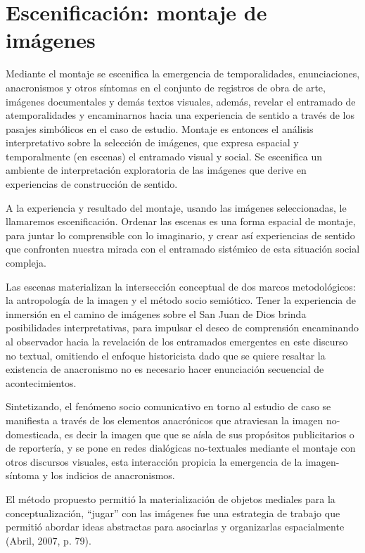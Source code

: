 \section{Escenificación: montaje de imágenes}

Mediante el montaje se escenifica la emergencia de temporalidades, enunciaciones, anacronismos y otros síntomas en el conjunto de registros de obra de arte, imágenes documentales y demás textos visuales, además, revelar el entramado de atemporalidades y encaminarnos hacia una experiencia de sentido a través de los pasajes simbólicos en el caso de estudio. Montaje es entonces el análisis interpretativo sobre la selección de imágenes, que expresa espacial y temporalmente (en escenas) el entramado visual y social. Se escenifica un ambiente de interpretación exploratoria de las imágenes que derive en experiencias de construcción de sentido.

A la experiencia y resultado del montaje, usando las imágenes seleccionadas, le llamaremos escenificación. Ordenar las escenas es una forma espacial de montaje, para juntar lo comprensible con lo imaginario, y crear así experiencias de sentido que confronten nuestra mirada con el entramado sistémico de esta situación social compleja.

Las escenas materializan la intersección conceptual de dos marcos metodológicos: la antropología de la imagen y el método socio semiótico. Tener la experiencia de inmersión en el camino de imágenes sobre el San Juan de Dios brinda posibilidades interpretativas, para impulsar el deseo de comprensión encaminando al observador hacia la revelación de los entramados emergentes en este discurso no textual, omitiendo el enfoque historicista dado que se quiere resaltar la existencia de anacronismo no es necesario hacer enunciación secuencial de acontecimientos.

Sintetizando, el fenómeno socio comunicativo en torno al estudio de caso se manifiesta a través de los elementos anacrónicos que atraviesan la imagen no-domesticada, es decir la imagen que que se aísla de sus propósitos publicitarios o de reportería, y se pone en redes dialógicas no-textuales mediante el montaje con otros discursos visuales, esta interacción propicia la emergencia de la imagen-síntoma y los indicios de anacronismos.

El método propuesto permitió la materialización de objetos mediales para la conceptualización, “jugar” con las imágenes fue una estrategia de trabajo que permitió abordar ideas abstractas para asociarlas y organizarlas espacialmente (Abril, 2007, p. 79).

